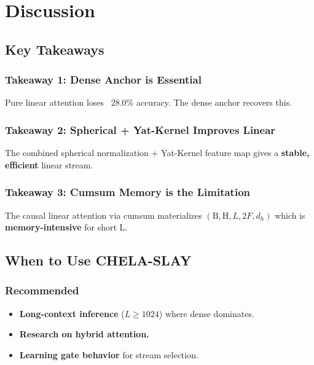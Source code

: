 \section{Discussion}

\subsection{Key Takeaways}

\subsubsection{Takeaway 1: Dense Anchor is Essential}

Pure linear attention loses ~28.0\% accuracy. The dense anchor 
recovers this.

\subsubsection{Takeaway 2: Spherical + Yat-Kernel Improves Linear}

The combined spherical normalization + Yat-Kernel feature map gives a 
\textbf{stable, efficient} linear stream.

\subsubsection{Takeaway 3: Cumsum Memory is the Limitation}

The causal linear attention via cumsum materializes 
$(\text{B}, \text{H}, L, 2F, d_h)$ which is \textbf{memory-intensive} for short L.

\subsection{When to Use CHELA-SLAY}

\subsubsection{Recommended}
\begin{itemize}
\item \textbf{Long-context inference} ($L \geq 1024$) where dense dominates.
\item \textbf{Research on hybrid attention.}
\item \textbf{Learning gate behavior} for stream selection.

\end{itemize}
